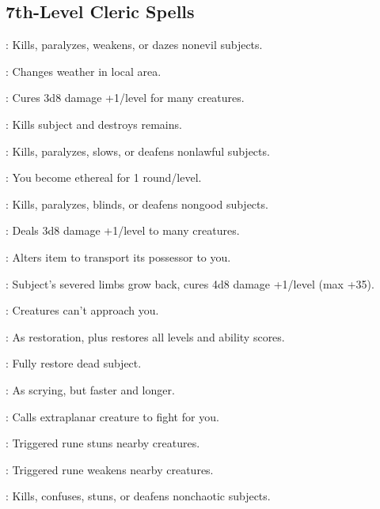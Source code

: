 \begin{multicols}{2}
\subsection{7th-Level Cleric Spells}
\begin{description*}
\item[\linkspell{Blasphemy}:] Kills, paralyzes, weakens, or dazes nonevil subjects.
\item[\linkspell{Control Weather}:] Changes weather in local area.
\item[\linkspell{Cure Serious Wounds, Mass}:] Cures 3d8 damage +1/level for many creatures.
\item[\linkspell{Destruction}:] Kills subject and destroys remains.
\item[\linkspell{Dictum}:] Kills, paralyzes, slows, or deafens nonlawful subjects.
\item[\linkspell{Ethereal Jaunt}:] You become ethereal for 1 round/level.
\item[\linkspell{Holy Word}:] Kills, paralyzes, blinds, or deafens nongood subjects.
\item[\linkspell{Inflict Serious Wounds, Mass}:] Deals 3d8 damage +1/level to many creatures.
\item[\linkspell{Refuge}:] Alters item to transport its possessor to you.
\item[\linkspell{Regenerate}:] Subject’s severed limbs grow back, cures 4d8 damage +1/level (max +35).
\item[\linkspell{Repulsion}:] Creatures can’t approach you.
\item[\linkspell{Restoration, Greater}:] As restoration, plus restores all levels and ability scores.
\item[\linkspell{Resurrection}:] Fully restore dead subject.
\item[\linkspell{Scrying, Greater}:] As scrying, but faster and longer.
\item[\linkspell{Summon Monster VII}:] Calls extraplanar creature to fight for you.
\item[\linkspell{Symbol of Stunning}:] Triggered rune stuns nearby creatures.
\item[\linkspell{Symbol of Weakness}:] Triggered rune weakens nearby creatures.
\item[\linkspell{Word of Chaos}:] Kills, confuses, stuns, or deafens nonchaotic subjects.
\end{description*}


\end{multicols}
